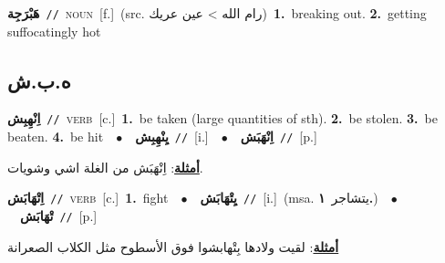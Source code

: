 \documentclass[10pt,a4paper,twoside]{article} %
\begin{document}
\begin{multicols}{2}
{{{\setlength\topsep{0pt}\textbf{\foreignlanguage{arabic}{هَبْرَجِة}}\ {\color{gray}\texttt{//}\color{black}}\ \textsc{noun}\ [f.]\ (src. \color{gray}\foreignlanguage{arabic}{رام الله > عين عريك}\color{black})\ \textbf{1.}~breaking out.  \textbf{2.}~getting suffocatingly hot\ 

\vspace{-3mm}
\subsection*{\color{blue}\foreignlanguage{arabic}{ه.ب.ش}\color{blue}{}} 

{\setlength\topsep{0pt}\textbf{\foreignlanguage{arabic}{اِنْهِبِش}}\ {\color{gray}\texttt{//}\color{black}}\ \textsc{verb}\ [c.]\ \textbf{1.}~be taken (large quantities of sth).  \textbf{2.}~be stolen.  \textbf{3.}~be beaten.  \textbf{4.}~be hit\ \ $\bullet$\ \ \setlength\topsep{0pt}\textbf{\foreignlanguage{arabic}{يِنْهِبِش}}\ {\color{gray}\texttt{//}\color{black}}\ [i.]\ \ $\bullet$\ \ \setlength\topsep{0pt}\textbf{\foreignlanguage{arabic}{اِنْهَبَش}}\ {\color{gray}\texttt{//}\color{black}}\ [p.]\  \begin{flushright}\color{gray}\foreignlanguage{arabic}{\textbf{\underline{\foreignlanguage{arabic}{أمثلة}}}: اِنْهَبَش من الغلة اشي وشويات.}\end{flushright}\color{black}} \vspace{2mm}

{\setlength\topsep{0pt}\textbf{\foreignlanguage{arabic}{اِتْهَابَش}}\ {\color{gray}\texttt{//}\color{black}}\ \textsc{verb}\ [c.]\ \textbf{1.}~fight\ \ $\bullet$\ \ \setlength\topsep{0pt}\textbf{\foreignlanguage{arabic}{يِتْهَابَش}}\ {\color{gray}\texttt{//}\color{black}}\ [i.]\ \color{gray}(msa. \foreignlanguage{arabic}{يتشاجر}~\foreignlanguage{arabic}{\textbf{١.}})\color{black}\ \ $\bullet$\ \ \setlength\topsep{0pt}\textbf{\foreignlanguage{arabic}{تْهَابَش}}\ {\color{gray}\texttt{//}\color{black}}\ [p.]\  \begin{flushright}\color{gray}\foreignlanguage{arabic}{\textbf{\underline{\foreignlanguage{arabic}{أمثلة}}}: لقيت ولادها بِتْهابشوا فوق الأسطوح مثل الكلاب الصعرانة}\end{flushright}\color{black}} \vspace{2mm}

}}}
\end{multicols}
\end{document}
